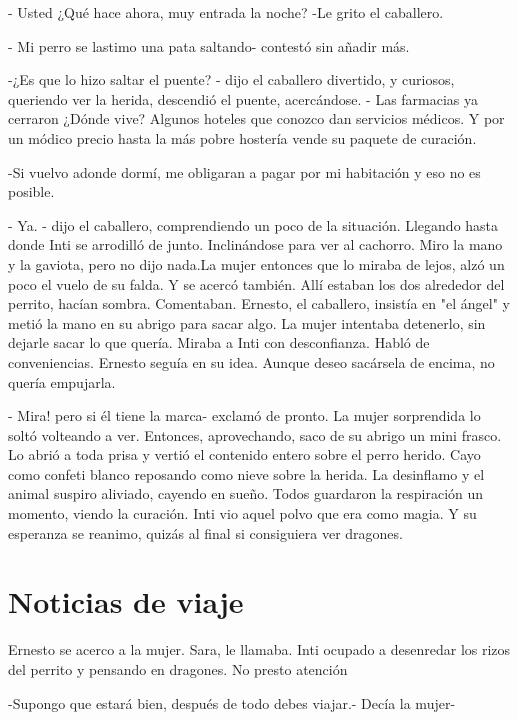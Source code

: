 - Usted ¿Qué hace ahora, muy entrada la noche? -Le grito el caballero.

- Mi perro se lastimo una pata saltando- contestó sin añadir más.

-¿Es que lo hizo saltar el puente? - dijo el caballero divertido, y curiosos, queriendo ver la herida, descendió el puente, acercándose. - Las farmacias ya cerraron ¿Dónde vive? Algunos hoteles que conozco dan servicios médicos. Y por un módico precio hasta la más pobre hostería vende su paquete de curación.

-Si vuelvo adonde dormí, me obligaran a pagar por mi habitación y eso no es posible.

- Ya. - dijo el caballero, comprendiendo un poco de la situación. Llegando hasta donde Inti se arrodilló de junto. Inclinándose para ver al cachorro. Miro la mano y la gaviota, pero no dijo nada.La mujer entonces que lo miraba de lejos, alzó un poco el vuelo de su falda. Y se acercó también. Allí estaban los dos alrededor del perrito, hacían sombra. Comentaban. Ernesto, el caballero, insistía en "el ángel" y metió la mano en su abrigo para sacar algo. La mujer intentaba detenerlo, sin dejarle sacar lo que quería. Miraba a Inti con desconfianza. Habló de conveniencias. Ernesto seguía en su idea. Aunque deseo sacársela de encima, no quería empujarla.

- Mira! pero si él tiene la marca- exclamó de pronto. La mujer sorprendida lo soltó volteando a ver. Entonces, aprovechando, saco de su abrigo un mini frasco. Lo abrió a toda prisa y vertió el contenido entero sobre el perro herido. Cayo como confeti blanco reposando como nieve sobre la herida. La desinflamo y el animal suspiro aliviado, cayendo en sueño. Todos guardaron la respiración un momento, viendo la curación. Inti vio aquel polvo que era como magia. Y su esperanza se reanimo, quizás al final si consiguiera ver dragones.



\chapter{Noticias de viaje}
Ernesto se acerco a la mujer. Sara, le llamaba. Inti ocupado a desenredar los rizos del perrito y pensando en dragones. No presto atención

-Supongo que estará bien, después de todo debes viajar.- Decía la mujer-

